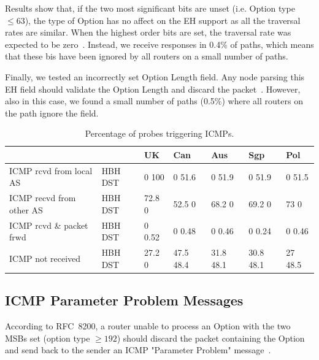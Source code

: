 \documentclass[conference]{IEEEtran}
\begin{document}
Results show that, if the two most significant bits are unset (i.e. Option type
$\le 63$), the type of Option has no affect on the EH support as all the
traversal rates are similar.  When the highest order bits are set, the
traversal rate was expected to be zero~\cite{RFC8200}.  Instead, we receive
responses in 0.4\% of paths, which means that these bis have been ignored by all
routers on a small number of paths.

Finally, we tested an incorrectly set Option Length field. Any node parsing
this EH field should validate the Option Length and discard the
packet~\cite{RFC8200}. However, also in this case, we found a small number of
paths (0.5\%) where all routers on the path ignore the field.

\begin{table}[t]
\centering
\caption{Percentage of probes triggering ICMPs.}
\label{tbl:icmp_support_dst}
\begin{tabular}{l|p{}|
p{}|p{}|p{}|p{}|p{}}
                           &          & UK        & Can       & Aus    & Sgp          & Pol     \\
\hline
\hline
{ICMP rcvd from local AS}  & {HBH DST} & {0 100}  & {0 51.6}    & {0 51.9}    & {0 51.9}    & {0 51.5}  \\
\hline
{ICMP recvd from other AS} & {HBH DST} & {72.8 0} & {52.5 0}    & {68.2 0}    & {69.2 0}    & {73  0}   \\
\hline
{ICMP rcvd \& packet frwd} & {HBH DST} & {0 0.52} & {0 0.48}    & {0 0.46}    & {0 0.24}    & {0 0.46}  \\
\hline
{ICMP not received}        & {HBH DST} & {27.2 0} & {47.5 48.4} & {31.8 48.1} & {30.8 48.1} & {27 48.5} 
\end{tabular}
\end{table}


\subsection{ICMP Parameter Problem Messages}


According to RFC~8200, a router unable to process an Option with the two MSBs
set (option type $\ge 192$) should discard the packet containing the Option and
send back to the sender an ICMP "Parameter Problem" message~\cite{RFC8200}.
\end{document}
